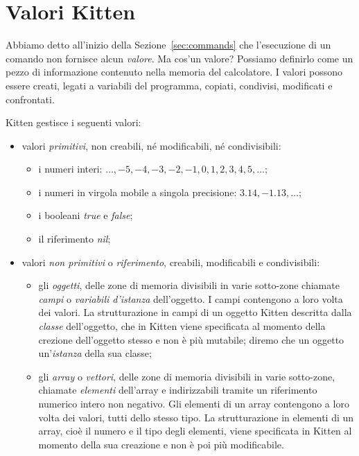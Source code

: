 \section{Valori Kitten}\label{sec:values}
%
Abbiamo detto all'inizio della Sezione~\ref{sec:commands} che l'esecuzione
di un comando non fornisce alcun \emph{valore}. Ma cos'\e un valore?
Possiamo definirlo come un pezzo di informazione contenuto nella memoria
del calcolatore. I valori possono essere creati, legati a variabili del
programma, copiati, condivisi, modificati e confrontati.

Kitten gestisce i seguenti valori:
%
\begin{itemize}
\item valori \emph{primitivi}, non creabili, n\'e modificabili,
      n\'e condivisibili:
      \begin{itemize}
      \item i numeri interi: $\ldots,-5,-4,-3,-2,-1,0,1,2,3,4,5,\ldots$;
      \item i numeri in virgola mobile a singola precisione:
            $3.14, -1.13,\ldots$;
      \item i booleani \textit{true} e \textit{false};
      \item il riferimento \textit{nil};
      \end{itemize}
\item valori \emph{non primitivi} o \emph{riferimento},
      creabili, modificabili e condivisibili:
      \begin{itemize}
      \item gli \emph{oggetti}, \cioe delle zone di memoria divisibili in
            varie sotto-zone chiamate \emph{campi} o \emph{variabili
            d'istanza}
            dell'oggetto. I campi contengono a loro volta dei valori.
            La strutturazione in campi di un oggetto Kitten \e descritta
            dalla \emph{classe} dell'oggetto, che in Kitten viene specificata
            al momento della crezione dell'oggetto stesso e non \`e pi\`u
            mutabile; diremo che un oggetto \e un'\emph{istanza} della
            sua classe;
      \item gli \emph{array} o \emph{vettori}, \cioe delle zone di memoria
            divisibili in varie sotto-zone, chiamate \emph{elementi}
            dell'array e indirizzabili tramite un
            riferimento numerico intero non negativo.
            Gli elementi di un array contengono a loro
            volta dei valori, tutti dello stesso tipo. La strutturazione in elementi di un array,
            cio\`e il numero e il tipo degli elementi,
            viene specificata in Kitten al momento della sua creazione e
            non \`e poi pi\`u modificabile.
      \end{itemize}
\end{itemize}
